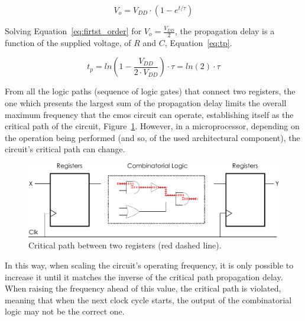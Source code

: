 \begin{equation}
    V_o=V_{DD} \cdot (1-e^{t/\tau})
    \label{eq:firtst_order}
\end{equation}

Solving Equation~\ref{eq:firtst_order} for $V_o=\frac{V_{DD}}{2}$, the propagation delay is a function of the supplied voltage, of $R$ and $C$, Equation~\ref{eq:tp}.


\begin{equation}
    t_p=ln(1-\frac{V_{DD}}{2 \cdot V_{DD}})\cdot\tau=ln(2)\cdot\tau
    \label{eq:tp}
\end{equation}


From all the logic paths (sequence of logic gates) that connect two registers, the one which presents the largest sum of the propagation delay limits the overall maximum frequency that the \acrshort{cmos} circuit can operate, establishing itself as the critical path of the circuit, Figure~\ref{fig:critical_path}. However, in a microprocessor, depending on the operation being performed (and so, of the used architectural component), the circuit's critical path can change.

\begin{figure}[htb]
    \centering
    \includegraphics[width=130mm]{Figures/Background/comb_logic.pdf}
    \caption{Critical path between two registers (red dashed line).}
    \label{fig:critical_path}
\end{figure}

In this way, when scaling the circuit's operating frequency, it is only possible to increase it until it matches the inverse of the critical path propagation delay. When raising the frequency ahead of this value, the critical path is violated, meaning that when the next clock cycle starts, the output of the combinatorial logic may not be the correct one.




